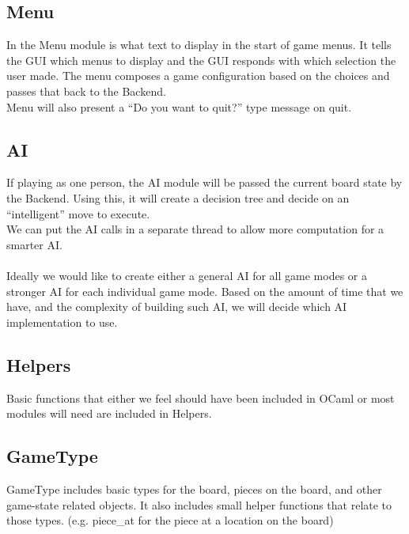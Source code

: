 \documentclass[11pt, oneside]{article}
\begin{document}
\subsection{Menu}
In the Menu module is what text to display in the start of game menus. It tells
the GUI which menus to display and the GUI responds with which selection the
user made. The menu composes a game configuration based on the choices and
passes that back to the Backend.\\
Menu will also present a ``Do you want to quit?'' type message on quit.

\subsection{AI}
If playing as one person, the AI module will be passed the current board state
by the Backend. Using this, it will create a decision tree and decide on an
``intelligent'' move
to execute.\\
We can put the AI calls in a separate thread to allow more computation for a
smarter AI.\\\\
Ideally we would like to create either a general AI for all game modes or a
stronger AI for each individual game mode. Based on the amount of time that we
have, and the complexity of building such AI, we will decide which AI
implementation to use.

\subsection{Helpers}
Basic functions that either we feel should have been included in OCaml or most
modules will need are included in Helpers.

\subsection{GameType}
GameType includes basic types for the board, pieces on the board, and other
game-state related objects. It also includes small helper functions that relate
to those types. (e.g. piece\_at for the piece at a location on the board)
\end{document}
